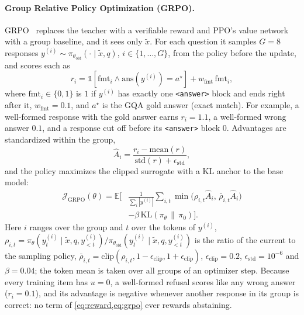 \paragraph{Group Relative Policy Optimization (GRPO).}
GRPO~\cite{shao2024deepseekmath} replaces the teacher with a verifiable reward and PPO's
value network with a group baseline, and it sees only $\tilde{x}$. For each question it
samples $G = 8$ responses $y^{(i)} \sim \pi_{\theta_{\mathrm{old}}}(\cdot \mid \tilde{x}, q)$,
$i \in \{1,\dots,G\}$, from the policy before the update, and scores each as
\begin{equation}
r_i = \mathds{1}\!\left[\mathrm{fmt}_i \wedge \mathrm{ans}(y^{(i)}) = a^\star\right]
      + w_{\mathrm{fmt}}\, \mathrm{fmt}_i,
\label{eq:reward}
\end{equation}
where $\mathrm{fmt}_i \in \{0,1\}$ is $1$ if $y^{(i)}$ has exactly one \texttt{<answer>}
block and ends right after it, $w_{\mathrm{fmt}} = 0.1$, and $a^\star$ is the GQA gold
answer (exact match). For
example, a well-formed response with the gold answer earns $r_i = 1.1$, a well-formed wrong
answer $0.1$, and a response cut off before its \texttt{<answer>} block $0$. Advantages are
standardized within the group,
\begin{equation}
\hat{A}_i = \frac{r_i - \mathrm{mean}(r)}{\mathrm{std}(r) + \epsilon_{\mathrm{std}}},
\label{eq:adv}
\end{equation}
and the policy maximizes the clipped surrogate with a KL anchor to the base model:
\begin{equation}
\begin{aligned}
\mathcal{J}_{\mathrm{GRPO}}(\theta) = \mathbb{E}\Big[
&\tfrac{1}{\sum_i |y^{(i)}|}\textstyle\sum_{i,t}
\min\!\big(\rho_{i,t}\hat{A}_i,\, \bar\rho_{i,t}\hat{A}_i\big) \\
&- \beta\,\mathrm{KL}(\pi_\theta \,\|\, \pi_0)\Big].
\end{aligned}
\label{eq:grpo}
\end{equation}
Here $i$ ranges over the group and $t$ over the tokens of $y^{(i)}$,
$\rho_{i,t} = \pi_\theta(y^{(i)}_t \mid \tilde{x}, q, y^{(i)}_{<t}) /
\pi_{\theta_{\mathrm{old}}}(y^{(i)}_t \mid \tilde{x}, q, y^{(i)}_{<t})$ is the ratio of the
current to the sampling policy, $\bar\rho_{i,t} = \mathrm{clip}(\rho_{i,t},
1 - \epsilon_{\mathrm{clip}}, 1 + \epsilon_{\mathrm{clip}})$, $\epsilon_{\mathrm{clip}} = 0.2$,
$\epsilon_{\mathrm{std}} = 10^{-6}$ and $\beta = 0.04$; the token mean is taken over all
groups of an optimizer step. Because every training item has $u = 0$, a well-formed refusal
scores like any wrong answer ($r_i = 0.1$), and its advantage is negative whenever another
response in its group is correct: no term of \cref{eq:reward,eq:grpo} ever rewards
abstaining.

